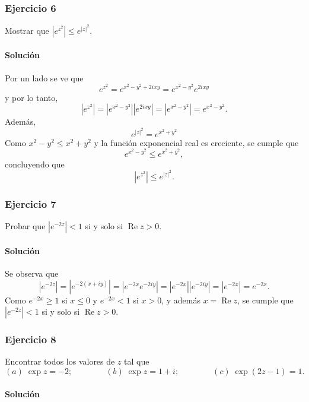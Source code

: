 \documentclass[a4paper]{report}
\renewcommand{\Re}{\operatorname{Re}}
\begin{document}
\subsubsection{Ejercicio 6}

Mostrar que \(|e^{z^2}|\leq e^{|z|^2}\).

\paragraph{Solución} Por un lado se ve que 
\[
 e^{z^2}=e^{x^2-y^2+2ixy}=e^{x^2-y^2}e^{2ixy}
\]
y por lo tanto,
\[
 |e^{z^2}|=|e^{x^2-y^2}||e^{2ixy}|=|e^{x^2-y^2}|=e^{x^2-y^2}.
\]
Además,
\[
 e^{|z|^2}=e^{x^2+y^2}
\]
Como \(x^2-y^2\leq x^2+y^2\) y la función exponencial real es creciente, se cumple que 
\[
 e^{x^2-y^2}\leq e^{x^2+y^2},
\]
concluyendo que 
\[
 |e^{z^2}|\leq e^{|z|^2}.
\]

\subsubsection{Ejercicio 7}

Probar que \(|e^{-2z}|<1\) si y solo si \(\Re z>0\).

\paragraph{Solución} Se observa que
\[
 |e^{-2z}|=|e^{-2(x+iy)}|=|e^{-2x}e^{-2iy}|=|e^{-2x}||e^{-2iy}|=|e^{-2x}|=e^{-2x}.
\]
Como \(e^{-2x}\geq1\) si \(x\leq0\) y \(e^{-2x}<1\) si \(x>0\), y además \(x=\Re z\), se cumple que \(|e^{-2z}|<1\) si y solo si \(\Re z>0\). 

\subsubsection{Ejercicio 8}

Encontrar todos los valores de \(z\) tal que 
\[
 (\textit{a})\;\exp z=-2;\qquad\qquad 
 (\textit{b})\;\exp z=1+i;\qquad\qquad
 (\textit{c})\;\exp(2z-1)=1.
\]

\paragraph{Solución} 
\end{document}
